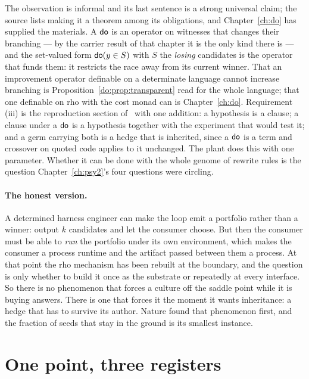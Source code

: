 The observation is informal and its last sentence is a strong universal
claim; the source lists making it a theorem among its obligations, and
Chapter~\ref{ch:do} has supplied the materials.
A $\textsf{do}$ is an operator on witnesses that changes their branching --- by
the carrier result of that chapter it is the only kind there is --- and
the set-valued form $\textsf{do}(y \in S)$ with $S$ the \emph{losing} candidates
is the operator that funds them: it restricts the race away from its
current winner.
That an improvement operator definable on a determinate language cannot
increase branching is Proposition~\ref{do:prop:transparent} read for
the whole language; that one definable on rho with the cost monad can
is Chapter~\ref{ch:do}.
Requirement (iii) is the reproduction section of \chSci\ with one
addition: a hypothesis is a clause; a clause under a $\textsf{do}$ is a
hypothesis together with the experiment that would test it; and a germ
carrying both is a hedge that is inherited, since a $\textsf{do}$ is a term and
crossover on quoted code applies to it unchanged.
The plant does this with one parameter.
Whether it can be done with the whole genome of rewrite rules is the
question Chapter~\ref{ch:psy2}'s four questions were circling.

\paragraph{The honest version.}
A determined harness engineer can make the loop emit a portfolio rather
than a winner: output $k$ candidates and let the consumer choose.
But then the consumer must be able to \emph{run} the portfolio under its
own environment, which makes the consumer a process runtime and the
artifact passed between them a process.
At that point the rho mechanism has been rebuilt at the boundary, and
the question is only whether to build it once as the substrate or
repeatedly at every interface.
So there is no phenomenon that forces a culture off the saddle point
while it is buying answers.
There is one that forces it the moment it wants inheritance: a hedge
that has to survive its author.
Nature found that phenomenon first, and the fraction of seeds that stay
in the ground is its smallest instance.

\section{One point, three registers}
\label{inh:sec:one}

